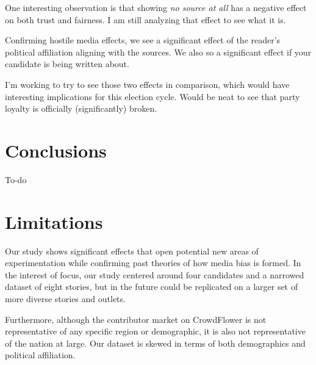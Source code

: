 One interesting observation is that showing \emph{no source at all} has a negative effect on both trust and fairness. I am still analyzing that effect to see what it is.
 
Confirming hostile media effects, we see a significant effect of the reader's political affiliation aligning with the sources. We also so a significant effect if your candidate is being written about. 

I'm working to try to see those two effects in comparison, which would have interesting implications for this election cycle. Would be neat to see that party loyalty is officially (significantly) broken.



\section{Conclusions}

To-do

\section{Limitations}

Our study shows significant effects that open potential new areas of experimentation while confirming past theories of how media bias is formed. In the interest of focus, our study centered around four candidates and a narrowed dataset of eight stories, but in the future could be replicated on a larger set of more diverse stories and outlets. 

Furthermore, although the contributor market on CrowdFlower is not representative of any specific region or demographic, it is also not representative of the nation at large. Our dataset is skewed in terms of both demographics and political affiliation.


